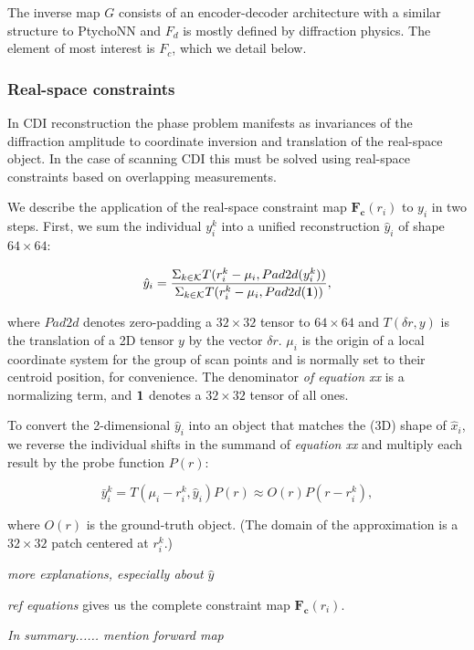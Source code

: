 \documentclass[sn-mathphys]{sn-jnl}%
\theoremstyle{thmstyleone}%
\theoremstyle{thmstyletwo}%
\theoremstyle{thmstylethree}%
\begin{document}
The inverse map $G$ consists of an encoder-decoder architecture with a similar structure to PtychoNN and $F_d$ is mostly defined by diffraction physics. The element of most interest is $F_c$, which we detail below.



\subsubsection{Real-space constraints}
In CDI reconstruction the phase problem manifests as invariances of the diffraction amplitude to coordinate inversion and translation of the real-space object. In the case of scanning CDI this must be solved using real-space constraints based on overlapping measurements.

We describe the application of the real-space constraint map $\mathbf{F_c}(r_i)$ to $y_i$ in two steps. First, we sum the individual $y_i^k$ into a unified reconstruction $\hat{y}_i$ of shape $64 \times 64$:


$$
\hat{y}_i = \frac{\Sigma_{k \in \mathcal{K}} T(r_i^k - \mu_i, Pad2d(y_i^k))} {\Sigma_{k \in \mathcal{K}} T(r_i^k - \mu_i, Pad2d(\bf{1}))},
$$

where $Pad2d$ denotes zero-padding a $32 \times 32$ tensor to $64 \times 64$ and $T(\delta r, y)$ is the translation of a 2D tensor $y$ by the vector $\delta r$. $\mu_i$ is the origin of a local coordinate system for the group of scan points and is normally set to their centroid position, for convenience. The denominator \emph{of equation xx} is a normalizing term, and $\bf{1}$ denotes a $32 \times 32$ tensor of all ones. 

To convert the 2-dimensional $\hat{y}_i$ into an object that matches the (3D) shape of $\hat{x}_i$, we reverse the individual shifts in the summand of \emph{equation xx} and multiply each result by the probe function $P(r)$:

$$
\bar{y}_i^k = T(\mu_i - r_i^k, \hat{y}_i) P(r) \approx O(r) P(r - r_i^k),
$$

where $O(r)$ is the ground-truth object. (The domain of the approximation is a $32 \times 32$ patch centered at $r_i^k$.)

\emph{more explanations, especially about $\hat{y}$}

\emph{ref equations} gives us the complete constraint map $\mathbf{F_c}(r_i)$. %

\emph{In summary...... mention forward map}
\end{document}
